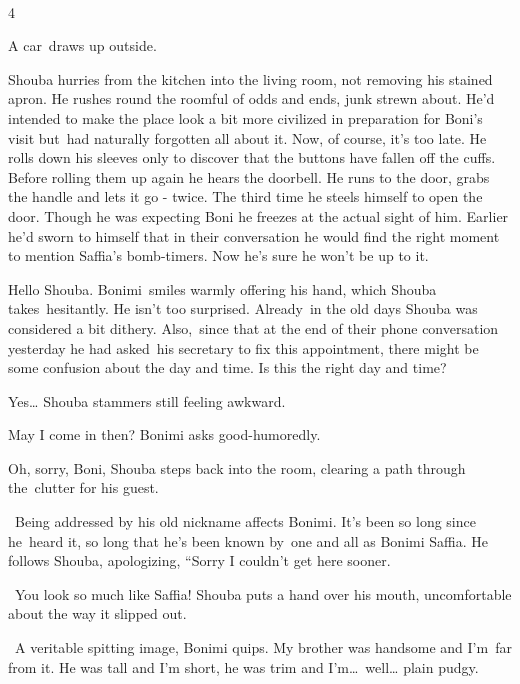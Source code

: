 \documentclass[letterpaper]{article}
\begin{document}
~

4

A car~draws up outside.\textcolor[rgb]{0.0,0.4392157,0.7529412}{\ }

Shouba hurries from the kitchen into the living room, not removing his stained apron. He rushes round the roomful of
odds and ends, junk strewn about. He{}'d intended to make the place look a bit more civilized in preparation for Boni's
visit but~had naturally forgotten all about it. Now, of course, it's too late. He rolls down his sleeves only to
discover that the buttons have fallen off the cuffs. Before rolling them up again he hears the doorbell. He runs to the
door, grabs the handle and lets it go - twice. The third time he steels himself to open the door. Though he was
expecting Boni he freezes at the actual sight of him. Earlier he{}'d sworn to himself that in their conversation he
would find the right moment to mention Saffia's bomb-timers. Now he{}'s sure he won't be up to it.

{\textquotedbl}Hello Shouba.{\textquotedbl} Bonimi~smiles warmly offering his hand, which Shouba takes~hesitantly. He
isn't too surprised. Already\ in the old days Shouba was considered a bit dithery.  Also,\ since that at the end of
their phone conversation yesterday he had asked~his secretary to fix this appointment, there might be some confusion
about the day and time. {\textquotedbl}Is this the right day and time?{\textquotedbl} 

{\textquotedbl}Yes{\dots}{\textquotedbl} Shouba stammers still feeling awkward.

{\textquotedbl}May I come in then?{\textquotedbl} Bonimi asks good-humoredly.

{\textquotedbl}Oh, sorry, Boni,{\textquotedbl} Shouba steps back into the room, clearing a path through the~clutter for
his guest. 

~Being addressed by his old nickname affects Bonimi. It's been so long since he~heard it, so long that he's been known
by\textcolor[rgb]{0.0,0.4392157,0.7529412}{\ }one and all as Bonimi Saffia. He follows Shouba, apologizing, ``Sorry I
couldn't get here sooner.{\textquotedbl}

~{\textquotedbl}You look so much like Saffia!{\textquotedbl} Shouba puts a hand over his mouth, uncomfortable about the
way it slipped out.

~{\textquotedbl}A veritable spitting image,{\textquotedbl} Bonimi quips. {\textquotedbl}My brother was handsome and
I'm~far from it. He was tall and I'm short, he was trim and I'm{\dots}\ well{\dots} plain pudgy. {\textquotedbl} 
\end{document}
